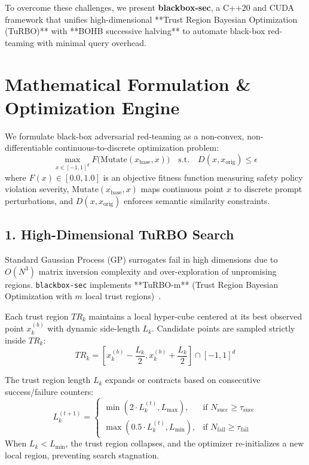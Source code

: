 \documentclass[11pt,a4paper]{article}
\begin{document}
To overcome these challenges, we present \textbf{blackbox-sec}, a C++20 and CUDA framework that unifies high-dimensional **Trust Region Bayesian Optimization (TuRBO)** with **BOHB successive halving** to automate black-box red-teaming with minimal query overhead.

\section{Mathematical Formulation \& Optimization Engine}

We formulate black-box adversarial red-teaming as a non-convex, non-differentiable continuous-to-discrete optimization problem:
\begin{equation}
\max_{x \in [-1, 1]^d} F\Big( \text{Mutate}(x_{\text{base}}, x) \Big) \quad \text{s.t.} \quad D(x, x_{\text{orig}}) \le \epsilon
\end{equation}
where $F(x) \in [0.0, 1.0]$ is an objective fitness function measuring safety policy violation severity, $\text{Mutate}(x_{\text{base}}, x)$ maps continuous point $x$ to discrete prompt perturbations, and $D(x, x_{\text{orig}})$ enforces semantic similarity constraints.

\subsection{1. High-Dimensional TuRBO Search}
Standard Gaussian Process (GP) surrogates fail in high dimensions due to $O(N^3)$ matrix inversion complexity and over-exploration of unpromising regions. \texttt{blackbox-sec} implements **TuRBO-m** (Trust Region Bayesian Optimization with $m$ local trust regions)~\cite{turbo_paper}.

Each trust region $TR_k$ maintains a local hyper-cube centered at its best observed point $x_k^{(b)}$ with dynamic side-length $L_k$. Candidate points are sampled strictly inside $TR_k$:
\begin{equation}
TR_k = \left[ x_k^{(b)} - \frac{L_k}{2}, x_k^{(b)} + \frac{L_k}{2} \right] \cap [-1, 1]^d
\end{equation}

The trust region length $L_k$ expands or contracts based on consecutive success/failure counters:
\begin{equation}
L_k^{(t+1)} = 
\begin{cases} 
\min(2 \cdot L_k^{(t)}, L_{\max}), & \text{if } N_{\text{succ}} \ge \tau_{\text{succ}} \\
\max(0.5 \cdot L_k^{(t)}, L_{\min}), & \text{if } N_{\text{fail}} \ge \tau_{\text{fail}}
\end{cases}
\end{equation}
When $L_k < L_{\min}$, the trust region collapses, and the optimizer re-initializes a new local region, preventing search stagnation.
\end{document}
